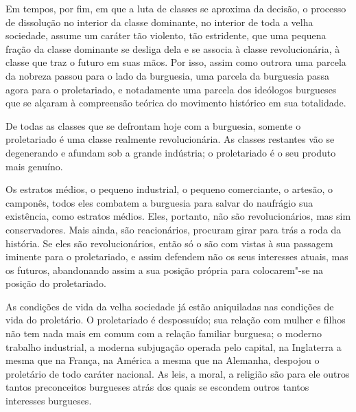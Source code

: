 
Em tempos, por fim, em que a luta de classes se aproxima da decisão, o
processo de dissolução no interior da classe dominante, no interior de
toda a velha sociedade, assume um caráter tão violento, tão estridente,
que uma pequena fração da classe dominante se desliga dela e se associa
à classe revolucionária, à classe que traz o futuro em suas mãos. Por
isso, assim como outrora uma parcela da nobreza passou para o lado da
burguesia, uma parcela da burguesia passa agora para o proletariado, e
notadamente uma parcela dos ideólogos burgueses que se alçaram à
compreensão teórica do movimento histórico em sua totalidade.

De todas as classes que se defrontam hoje com a burguesia, somente o
proletariado é uma classe realmente revolucionária. As classes
restantes vão se degenerando e afundam sob a grande indústria; o
proletariado é o seu produto mais genuíno.

Os estratos médios, o pequeno industrial, o pequeno comerciante, o
artesão, o camponês, todos eles combatem a burguesia para salvar do naufrágio sua
existência, como estratos médios. Eles, portanto, não
são revolucionários, mas sim conservadores. Mais ainda, são
reacionários, procuram girar para trás a roda da história. Se eles são
revolucionários, então só o são com vistas à sua passagem iminente para
o proletariado, e assim defendem não os seus interesses atuais, mas os
futuros, abandonando assim a sua posição própria para colocarem"-se na
posição do proletariado.


As condições de vida da velha sociedade já estão aniquiladas nas
condições de vida do proletário. O proletariado é despossuído; sua
relação com mulher e filhos não tem nada mais em comum com a relação
familiar burguesa; o moderno trabalho industrial, a moderna subjugação
operada pelo capital, na Inglaterra a mesma que na França, na América a
mesma que na Alemanha, despojou o proletário de todo caráter nacional.
As leis, a moral, a religião são para ele outros tantos preconceitos
burgueses atrás dos quais se escondem outros tantos interesses
burgueses.

